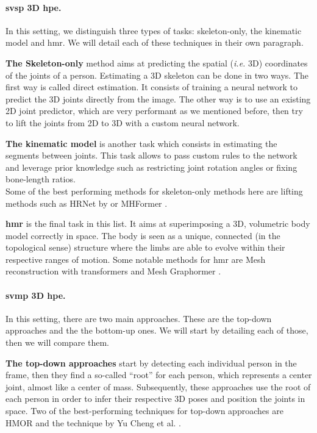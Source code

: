 \documentclass[runningheads]{llncs}
\begin{document}
\paragraph{\ac{svsp} 3D \ac{hpe}.}
In this setting, we distinguish three types of tasks:  skeleton-only, the kinematic model and \ac{hmr}. We will detail each of these techniques in their own paragraph.

\textbf{The Skeleton-only} method aims at predicting the spatial (\textit{i.e.} 3D) coordinates of the joints of a person. Estimating a 3D skeleton can be done in two ways. The first way is called direct estimation. It consists of training a neural network to predict the 3D joints directly from the image. The other way is to use an existing 2D joint predictor, which are very performant as we mentioned before, then try to lift the joints from 2D to 3D with a custom neural network.

\textbf{The kinematic model} is another task which consists in estimating the segments between joints. This task allows to pass custom rules to the network and leverage prior knowledge such as restricting joint rotation angles or fixing bone-length ratios. \\
Some of the best performing methods for skeleton-only methods here are lifting methods such as HRNet \cite{hrnet} by  or MHFormer \cite{multi hypothesis transformer}.

\textbf{\ac{hmr}} is the final task in this list. It aims at superimposing a 3D, volumetric body model correctly in space. The body is seen as a unique, connected (in the topological sense) structure where the limbs are able to evolve within their respective ranges of motion. Some notable methods for \ac{hmr} are
Mesh reconstruction with transformers \cite{mesh reconstruction with transformers} and Mesh Graphormer \cite{mesh graphormer}.
\paragraph{\ac{svmp} 3D \ac{hpe}.}
In this setting, there are two main approaches. These are the top-down approaches and the the bottom-up ones. We will start by detailing each of those, then we will compare them.

\textbf{The top-down approaches} start by detecting each individual person in the frame, then they find a so-called ``root'' for each person, which represents a center joint, almost like a center of mass. Subsequently, these approaches use the root of each person in order to infer their respective 3D poses and position the joints in space. Two of the best-performing techniques for top-down approaches are HMOR \cite{HMOR} and the technique by Yu Cheng et al. \cite{graph and temporal convolutional network}.
\end{document}
